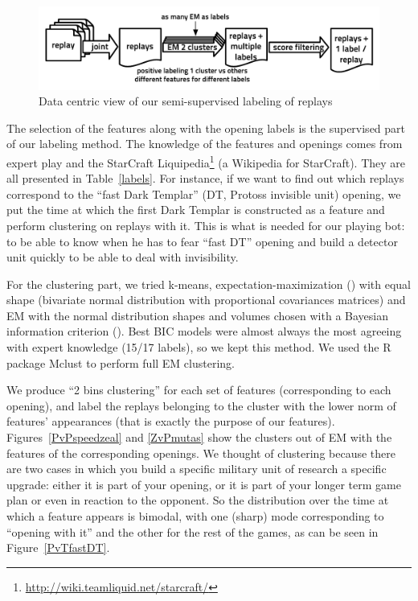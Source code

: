 \begin{figure}[h]
\centerline{\includegraphics[width=0.76\columnwidth]{images/replays_labeling.pdf}}
\caption{Data centric view of our semi-supervised labeling of replays}
\label{replays_labeling}
\end{figure}

The selection of the features along with the opening labels is the supervised part of our labeling method. The knowledge of the features and openings comes from expert play and the StarCraft Liquipedia\footnote{\url{http://wiki.teamliquid.net/starcraft/}} (a Wikipedia for StarCraft). They are all presented in Table~\ref{labels}. For instance, if we want to find out which replays correspond to the ``fast Dark Templar'' (DT, Protoss invisible unit) opening, we put the time at which the first Dark Templar is constructed as a feature and perform clustering on replays with it. This is what is needed for our playing bot: to be able to know when he has to fear ``fast DT'' opening and build a detector unit quickly to be able to deal with invisibility.


For the clustering part, we tried k-means, expectation-maximization () with equal shape (bivariate normal distribution with proportional covariances matrices) and EM with the normal distribution shapes and volumes chosen with a Bayesian information criterion (). Best BIC models were almost always the most agreeing with expert knowledge (15/17 labels), so we kept this method. We used the R package Mclust \citep{Mclust,Mclust2} to perform full EM clustering. 


We produce ``2 bins clustering'' for each set of features (corresponding to each opening), and label the replays belonging to the cluster with the lower norm of features' appearances (that is exactly the purpose of our features). Figures~\ref{PvPspeedzeal} %
and \ref{ZvPmutas} show the clusters out of EM with the features of the corresponding openings. We thought of clustering because there are two cases in which you build a specific military unit of research a specific upgrade: either it is part of your opening, or it is part of your longer term game plan or even in reaction to the opponent. So the distribution over the time at which a feature appears is bimodal, with one (sharp) mode corresponding to ``opening with it'' and the other for the rest of the games, as can be seen in Figure~\ref{PvTfastDT}.

